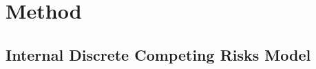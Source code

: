 \documentclass{article}
\theoremstyle{plain}
\theoremstyle{definition}
\theoremstyle{remark}
\begin{document}
\section{Method}
\label{s:model}

\subsection{Internal Discrete Competing Risks Model}
\label{section: Internal}
\end{document}
